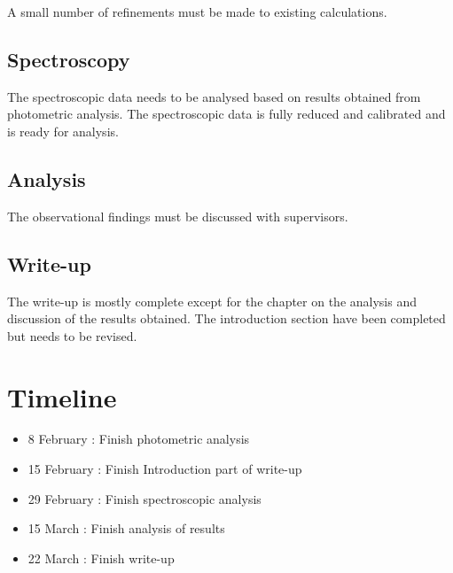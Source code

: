 \documentclass[a4paper,10pt]{article}
\begin{document}
A small number of refinements must be made to existing calculations.


\subsection{Spectroscopy}

The spectroscopic data needs to be analysed based on results obtained from photometric analysis. The spectroscopic data is fully reduced and calibrated and is ready for analysis.


\subsection{Analysis}

The observational findings must be discussed with supervisors. 


\subsection{Write-up}

The write-up is mostly complete except for the chapter on the analysis and discussion of the results obtained. The introduction section have been completed but needs to be revised.


\section{Timeline}



\begin{itemize}
 \item 8 February  : Finish photometric analysis
 \item 15 February : Finish Introduction part of write-up
 \item 29 February : Finish spectroscopic analysis
 \item 15 March    : Finish analysis of results
 \item 22 March    : Finish write-up
\end{itemize}
\end{document}
